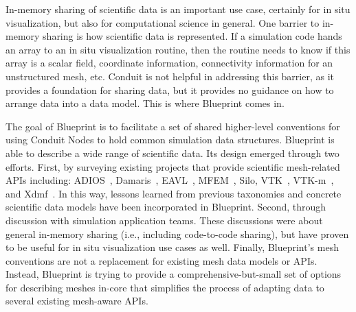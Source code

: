 
%
In-memory sharing of scientific data is an important use case,
certainly for in situ visualization, but also for computational science in general.
%
One barrier to in-memory sharing is how scientific data is represented.
%
If a simulation code hands an array to an in situ visualization routine, then the routine
needs to know if this array is a scalar field, coordinate information, connectivity information
for an unstructured mesh, etc.
%
Conduit is not helpful in addressing this barrier,
as it provides a foundation for sharing data, but it provides no guidance on
how to arrange
data into a data model.
%
This is where Blueprint comes in.
%
%


The goal of Blueprint is to facilitate a set of shared higher-level
conventions for using Conduit Nodes to hold common simulation data structures.
%
Blueprint is able to describe a wide range of scientific data.
%
Its design emerged through two efforts.
%
First, by surveying existing
projects that provide scientific mesh-related APIs including:
ADIOS~\cite{Lofstead2008},
Damaris~\cite{damaris},
EAVL~\cite{EAVL},
MFEM~\cite{mfem-library},
Silo,
VTK~\cite{vtk},
VTK-m~\cite{Moreland:CGA2016},
and Xdmf~\cite{xdmf}.
%
In this way, lessons learned from previous taxonomies and concrete scientific data models
have been incorporated in Blueprint.
%
Second, through discussion with simulation application teams.
%
These discussions were about general in-memory sharing (i.e., including code-to-code sharing),
but have proven to be useful for in situ visualization use cases as well.
%
Finally,
Blueprint's mesh conventions are not a replacement for existing mesh data models or APIs.
%
Instead, Blueprint is trying to provide a comprehensive-but-small set of options for
describing meshes in-core that simplifies
the process of adapting data to several existing mesh-aware APIs.



%
%

